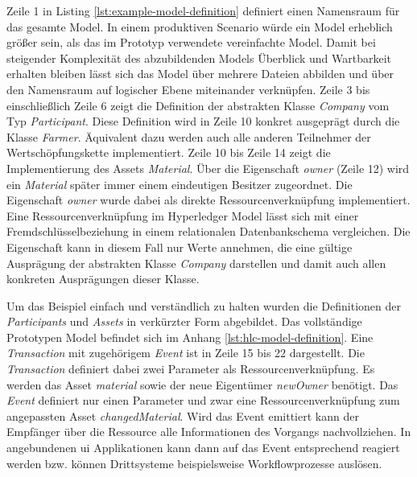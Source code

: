 Zeile 1 in Listing \ref{lst:example-model-definition} definiert einen Namensraum für das gesamte Model. In einem produktiven Scenario würde ein Model erheblich größer sein, als das im Prototyp verwendete vereinfachte Model. Damit bei steigender Komplexität des abzubildenden Models Überblick und Wartbarkeit erhalten bleiben lässt sich das Model über mehrere Dateien abbilden und über den Namensraum auf logischer Ebene miteinander verknüpfen. Zeile 3 bis einschließlich Zeile 6 zeigt die Definition der abstrakten Klasse \textit{Company} vom Typ \textit{Participant}. Diese Definition wird in Zeile 10 konkret ausgeprägt durch die Klasse \textit{Farmer}. Äquivalent dazu werden auch alle anderen Teilnehmer der Wertschöpfungskette implementiert. Zeile 10 bis Zeile 14 zeigt die Implementierung des Assets \textit{Material}. Über die Eigenschaft \textit{owner} (Zeile 12) wird ein \textit{Material} später immer einem eindeutigen Besitzer zugeordnet. Die Eigenschaft \textit{owner} wurde dabei als direkte Ressourcenverknüpfung implementiert. Eine Ressourcenverknüpfung im Hyperledger Model lässt sich mit einer Fremdschlüsselbeziehung in einem relationalen Datenbankschema vergleichen. Die Eigenschaft kann in diesem Fall nur Werte annehmen, die eine gültige Ausprägung der abstrakten Klasse \textit{Company} darstellen und damit auch allen konkreten Ausprägungen dieser Klasse.

Um das Beispiel einfach und verständlich zu halten wurden die Definitionen der \textit{Participants} und \textit{Assets} in verkürzter Form abgebildet. Das vollständige Prototypen Model befindet sich im Anhang \ref{lst:hlc-model-definition}. Eine \textit{Transaction} mit zugehörigem \textit{Event} ist in Zeile 15 bis 22 dargestellt. Die \textit{Transaction} definiert dabei zwei Parameter als Ressourcenverknüpfung. Es werden das Asset \textit{material} sowie der neue Eigentümer \textit{newOwner} benötigt. Das \textit{Event} definiert nur einen Parameter und zwar eine Ressourcenverknüpfung zum angepassten Asset \textit{changedMaterial}. Wird das Event emittiert kann der Empfänger über die Ressource alle Informationen des Vorgangs nachvollziehen. In angebundenen \ac{ui} Applikationen kann dann auf das Event entsprechend reagiert werden bzw. können Drittsysteme beispielsweise Workflowprozesse auslösen.

